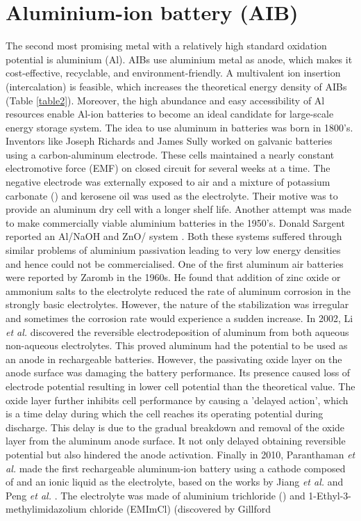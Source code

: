 \section{Aluminium-ion battery (AIB)}
The second most promising metal with a relatively high standard oxidation potential is aluminium (Al). AIBs use aluminium metal as anode, which makes it cost-effective, recyclable, and environment-friendly. A multivalent ion insertion (intercalation) is feasible, which increases the theoretical energy density of AIBs (Table \ref{table2}). Moreover, the high abundance and easy accessibility of Al resources enable Al-ion batteries to become an ideal candidate for large-scale energy storage system. 
The idea to use aluminum in batteries was born in 1800's. Inventors like Joseph Richards and James Sully worked on galvanic batteries using a carbon-aluminum electrode\cite{richards_aluminum_1887, sully_james_1897}. These cells maintained a nearly constant electromotive force (EMF) on closed circuit for several weeks at a time. The negative electrode was externally exposed to air and a mixture of potassium carbonate () and kerosene oil was used as the electrolyte. Their motive was to provide an aluminum dry cell with a longer shelf life. Another attempt was made to make commercially viable aluminium batteries in the 1950's. Donald Sargent reported an Al/NaOH and ZnO/ system \cite{sargent_voltaic_1951}. Both these systems suffered through similar problems of aluminium passivation leading to very low energy densities and hence could not be commercialised. One of the first aluminum air batteries were reported by Zaromb\cite{zaromb_use_1962} in the 1960s. He found that addition of zinc oxide or ammonium salts to the electrolyte reduced the rate of aluminum corrosion in the strongly basic electrolytes. However, the nature of the stabilization was irregular and sometimes the corrosion rate would experience a sudden increase\cite{bockstie_control_1963}. In 2002, Li \textit{et al.} discovered the reversible electrodeposition of aluminum from both aqueous non-aqueous electrolytes\cite{li_aluminum_2002}. This proved aluminum had the potential to be used as an anode in rechargeable batteries. However, the passivating oxide layer on the anode surface was damaging the battery performance. Its presence caused loss of electrode potential resulting in lower cell potential than the theoretical value. The oxide layer further inhibits cell performance by causing a 'delayed action', which is a time delay during which the cell reaches its operating potential during discharge. This delay is due to the gradual breakdown and removal of the oxide layer from the aluminum anode surface. It not only delayed obtaining reversible potential but also hindered the anode activation. Finally in 2010, Paranthaman \textit{et al.} made the first rechargeable aluminum-ion battery using a cathode composed of  and an ionic liquid as the electrolyte, based on the works by Jiang \textit{et al.} and Peng \textit{et al.} \cite{paranthaman_transformational_2010-1, jiang_electrodeposition_2006-1,peng_investigation_2008}. The electrolyte was made of aluminium trichloride () and 1-Ethyl-3-methylimidazolium chloride (EMImCl) (discovered by Gillford 